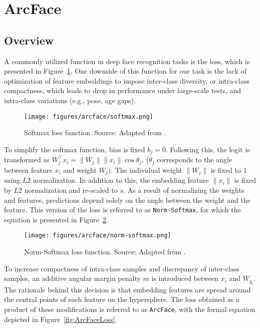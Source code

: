 \documentclass[10pt,a4paper,twoside]{article}
\begin{document}
\section{ArcFace}

\subsection{Overview}
A commonly utilized function in deep face recognition tasks is the loss, which is presented in Figure~\ref{fig:arc_softmax}. One downside of this function for our task is the lack of optimization of feature embeddings to impose inter-class diversity, or intra-class compactness, which leads to drop in performance under large-scale tests, and intra-class variations (e.g., pose, age gaps).

\begin{figure}[h]
    \centering
    \texttt{[image: figures/arcface/softmax.png]} 
    \caption{Softmax loss function. Source: Adapted from \cite{arcface}.}
    \label{fig:arc_softmax}
\end{figure}

To simplify the softmax function, bias is fixed \(b_j = 0\). Following this, the logit is transformed as \( W_j^\top x_i = \|W_j\| \|x_i\| \cos \theta_j \). (\( \theta_j \) corresponds to the angle between feature \( x_i \) and  weight \( W_j \)). The individual weight \(\|W_j\|\) is fixed to 1 using \(L2\) normalization. In addition to this, the embedding feature \(\|x_i\|\) is fixed by \(L2\) normalization and re-scaled to \(s\). As a result of normalizing the weights and features, predictions depend solely on the angle between the weight and the feature. This version of the loss is referred to as \texttt{Norm-Softmax}, for which the equation is presented in Figure~\ref{fig:norm-softmax}.

\begin{figure}[h]
    \centering
    \texttt{[image: figures/arcface/norm-softmax.png]} 
    \caption{Norm-Softmax loss function. Source: Adapted from \cite{arcface}.}
    \label{fig:norm-softmax}
\end{figure}

To increase compactness of intra-class samples and discrepancy of inter-class samples, an additive angular margin penalty \(m\) is introduced between \(x_i\) and \(W_{y_i}\). The rationale behind this decision is that embedding features are spread around the central points of each feature on the hypersphere. The loss obtained as a product of these modifications is referred to as \texttt{ArcFace}, with the formal equation depicted in Figure~\ref{fig:ArcFaceLoss}.
\end{document}
